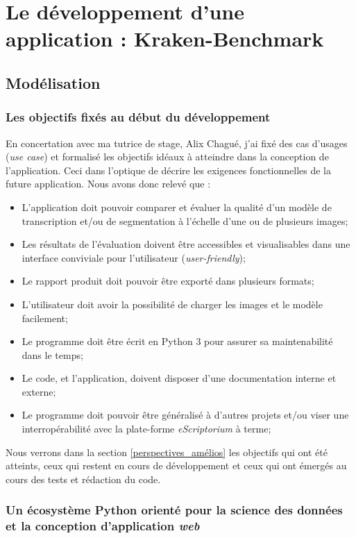 \chapter{Le développement d'une application : Kraken-Benchmark}

\section{Modélisation}

\subsection{Les objectifs fixés au début du développement}\label{objectifs}
En concertation avec ma tutrice de stage, Alix Chagué, j'ai fixé des cas d'usages (\textit{use case}) et formalisé les objectifs idéaux à atteindre dans la conception de l'application. Ceci dans l'optique de  décrire les exigences fonctionnelles de la future application. Nous avons donc relevé que :

\begin{itemize}
    \item L'application doit pouvoir comparer et évaluer la qualité d'un modèle de transcription et/ou de segmentation à l'échelle d'une ou de plusieurs images;
    \item Les résultats de l'évaluation doivent être accessibles et visualisables dans une interface conviviale pour l'utilisateur (\textit{user-friendly});
    \item Le rapport produit doit pouvoir être exporté dans plusieurs formats;
    \item L'utilisateur doit avoir la possibilité de charger les images et le modèle facilement;
    \item Le programme doit être écrit en Python 3 pour assurer sa  maintenabilité dans le temps;
    \item Le code, et l'application, doivent disposer d'une documentation interne et externe;
    \item Le programme doit pouvoir être généralisé à d'autres projets et/ou viser une interropérabilité avec la plate-forme \textit{eScriptorium} à terme;
\end{itemize}

Nous verrons dans la section \ref{perspectives_amélios} les objectifs qui ont été atteints, ceux qui restent en cours de développement et ceux qui ont émergés au cours des tests et rédaction du code. 

\subsection{Un écosystème Python orienté pour la science des données et la conception d'application \textit{web}}

